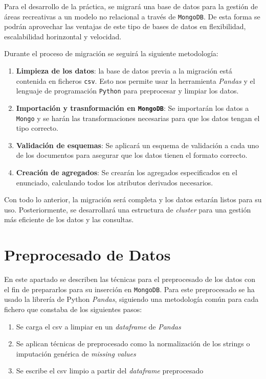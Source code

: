 \documentclass[]{article}
\begin{document}
Para el desarrollo de la práctica, se migrará una base de datos para la gestión de áreas
recreativas a un modelo no relacional a través de \texttt{MongoDB}. De esta
forma se podrán aprovechar las ventajas de este tipo de bases de datos en flexibilidad,
escalabilidad horinzontal y velocidad.

Durante el proceso de migración se seguirá la siguiente metodología:
\begin{enumerate}
    \item \textbf{Limpieza de los datos}: la base de datos previa a la migración está
    contenida en ficheros \texttt{csv}. Esto nos permite usar la herramienta
    \textit{Pandas} y el lenguaje de programación \texttt{Python} para preprocesar y
    limpiar los datos.
    \item \textbf{Importación y trasnformación en \texttt{MongoDB}}: Se importarán los
    datos a \texttt{Mongo} y se harán las transformaciones necesarias para que los datos
    tengan el tipo correcto.
    \item \textbf{Validación de esquemas}: Se aplicará un esquema de validación a cada uno
    de los documentos para asegurar que los datos tienen el formato correcto.
    \item \textbf{Creación de agregados}: Se crearán los agregados especificados en el
    enunciado, calculando todos los atributos derivados necesarios.
\end{enumerate}

Con todo lo anterior, la migración será completa y los datos estarán listos para su uso.
Posteriormente, se desarrollará una estructura de \textit{cluster} para una gestión más
eficiente de los datos y las consultas.

\newpage
\lstset{style=python}
\section{Preprocesado de Datos}
\label{sec:preprocesado}
En este apartado se describen las técnicas para el preprocesado de los datos con
el fin de prepararlos para su inserción en \texttt{MongoDB}. Para este preprocesado se ha usado la librería de Python \textit{Pandas}, siguiendo una metodología común para cada fichero que constaba de los siguientes pasos:

\begin{enumerate}
    \item Se carga el csv a limpiar en un \textit{dataframe} de \textit{Pandas}
    \item Se aplican técnicas de preprocesado como la normalización de los strings o imputación genérica de \textit{missing values}
    \item Se escribe el csv limpio a partir del \textit{dataframe} preprocesado
\end{enumerate}
\end{document}
